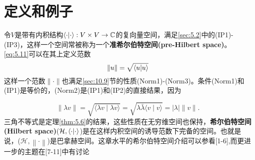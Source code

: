 
\section{定义和例子}
令$V$是带有内积结构\(\braket{\cdot|\cdot}:V\times V\rightarrow\mathbb{C}\)的复向量空间，满足\ref{sec:5.2}中的(IP1)-(IP3)，这样一个空间常被称为一个\textbf{准希尔伯特空间(pre-Hilbert space)}。\ref*{eq:5.11}可以在其上定义范数
\[\left\lVert u\right\rVert =\sqrt{\braket{u|u}}\]
这样一个范数\(\lVert \cdot\rVert \)也满足\ref{sec:10.9}节的性质(Norm1)-(Norm3)。条件(Norm1)和(IP1)是等价的，(Norm2)是(IP1)和(IP2)的直接结果，因为

\begin{equation}
    \|\lambda v\|=\sqrt{\langle\lambda v \mid \lambda v\rangle}=\sqrt{\lambda \bar{\lambda}\langle v \mid v\rangle}=|\lambda|\|v\| .
\end{equation}
三角不等式是定理\ref{thm:5.6}的结果，这些性质在无穷维空间也保持，\textbf{希尔伯特空间(Hilbert space)}(\(\mathcal{H},\braket{\cdot|\cdot}\))是在这样内积空间的诱导范数下完备的空间。也就是说，(\(\mathcal{H},\left\lVert \cdot\right\rVert \))是巴拿赫空间。这章水平的希尔伯特空间介绍可以参看[1-6],而更进一步的主题在[7-11]中有讨论


